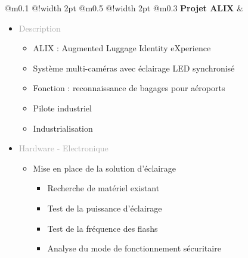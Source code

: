 \documentclass{article}
\begin{document}
\begin{tabular}
    {
        @{}m{}
        @{\hspace{0.001\textwidth}}!{\color{secondaryBlue}\vline width 2pt} %
        @{}m{0.5\textwidth}
        @{\hspace{0.025\textwidth}}!{\color{secondaryBlue}\vline width 2pt} %
        @{{\hspace{0.001\textwidth}}}m{0.3\textwidth}
    }
    \textcolor{secondaryBlue}
    {
        \textbf{Projet ALIX}
    }           
    &
    \begin{itemize}
        [label={}, topsep=0pt, partopsep=0pt, itemsep=0.5pt, parsep=2pt]
        \setlength{\itemsep}{0pt} 
        \item \textcolor{darkGray}{Description}
        \begin{itemize}
        [label={\textcolor{gray!80}{\checkmark}}, topsep=0pt, partopsep=0pt, itemsep=0.5pt, parsep=2pt] 
            \item \textcolor{gray!80}{ALIX : Augmented Luggage Identity eXperience}
            \item \textcolor{gray!80}{Système multi-caméras avec éclairage LED synchronisé}
            \item \textcolor{gray!80}{Fonction : reconnaissance de bagages pour aéroports}
            \item \textcolor{gray!80}{Pilote industriel}
            \item \textcolor{gray!80}{Industrialisation}
        \end{itemize}
        \item \textcolor{darkGray}{Hardware - Electronique}
        \begin{itemize}
        [label={\textcolor{gray!80}{\checkmark}}, topsep=0pt, partopsep=0pt, itemsep=0.5pt, parsep=2pt] 
            \item \textcolor{gray!80}{Mise en place de la solution d'éclairage}
            \begin{itemize}
                [label={\textcolor{gray!80}{\checkmark}}, topsep=0pt, partopsep=0pt, itemsep=0.5pt, parsep=2pt] 
                \item \textcolor{gray!80}{Recherche de matériel existant}
                \item \textcolor{gray!80}{Test de la puissance d'éclairage}
                \item \textcolor{gray!80}{Test de la fréquence des flashs}
                \item \textcolor{gray!80}{Analyse du mode de fonctionnement sécuritaire}

\end{itemize}
\end{itemize}
\end{itemize}
\end{tabular}
\end{document}
